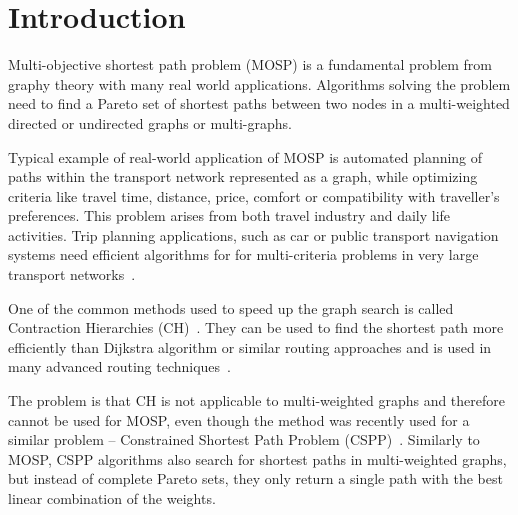 % 
%  
%  
%  

\section{Introduction}
\label{secIntroduction}

Multi-objective shortest path problem (MOSP) is a fundamental problem from graphy theory with many real world applications. Algorithms solving the problem need to find a Pareto set of shortest paths between two nodes in a multi-weighted directed or undirected graphs or multi-graphs. 

Typical example of real-world application of MOSP is automated planning of paths within the transport network represented as a graph, while optimizing criteria like travel time, distance, price, comfort or compatibility with traveller's preferences. This problem arises from both travel industry and daily life activities. Trip planning applications, such as car or public transport navigation systems need efficient algorithms for for multi-criteria problems in very large transport networks~\cite{veneti2016time}. 


One of the common methods used to speed up the graph search is called Contraction Hierarchies (CH)~\cite{geisberger2008contraction}. They can be used to find the shortest path more efficiently than Dijkstra algorithm or similar routing approaches and is used in many advanced routing techniques~\cite{delling2009engineering}. 

The problem is that CH is not applicable to multi-weighted graphs and therefore cannot be used for MOSP, even though the method was recently used for a similar problem -- Constrained Shortest Path Problem (CSPP)~\cite{pugliese2013survey,funke2013polynomial}. Similarly to MOSP, CSPP algorithms also search for shortest paths in multi-weighted graphs, but instead of complete Pareto sets, they only return a single path with the best linear combination of the weights.  

